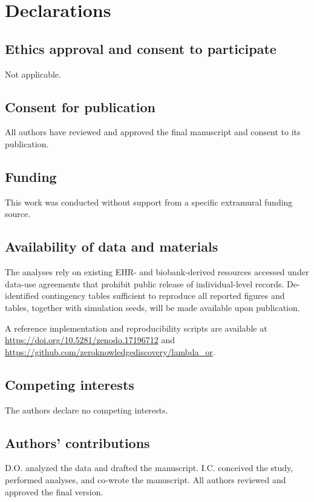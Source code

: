 \documentclass[pdflatex,sn-mathphys-num]{sn-jnl}%
\theoremstyle{thmstyleone}%
\theoremstyle{thmstyletwo}%
\theoremstyle{thmstylethree}%
\begin{document}
\section{Declarations}

\subsection*{Ethics approval and consent to participate}
Not applicable.

\subsection{Consent for publication}
All authors have reviewed and approved the final manuscript and consent to its publication.

\subsection*{Funding}
This work was conducted without support from a specific extramural funding source.

\subsection*{Availability of data and materials}
The analyses rely on existing EHR- and biobank-derived resources accessed under data-use agreements that prohibit public release of individual-level records. De-identified contingency tables sufficient to reproduce all reported figures and tables, together with simulation seeds, will be made available upon publication.

A reference implementation and reproducibility scripts are available at \url{https://doi.org/10.5281/zenodo.17196712} and \url{https://github.com/zeroknowledgediscovery/lambda_or}.

\subsection*{Competing interests}
The authors declare no competing interests.

\subsection*{Authors' contributions}
D.O. analyzed the data and drafted the manuscript. I.C. conceived the study, performed analyses, and co-wrote the manuscript. All authors reviewed and approved the final version.
\end{document}

